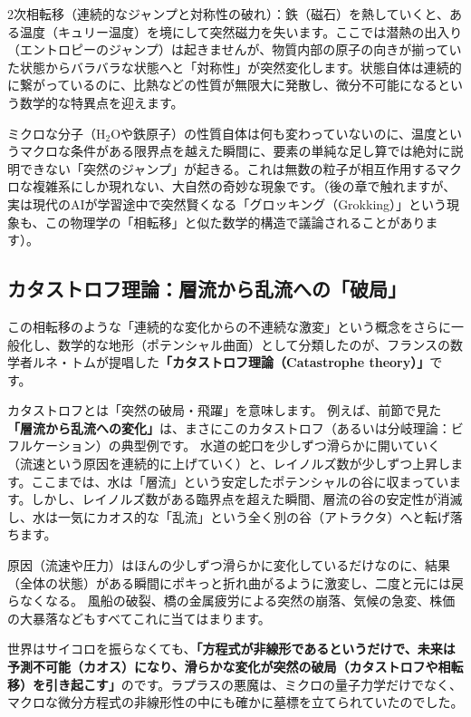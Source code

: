 2次相転移（連続的なジャンプと対称性の破れ）：鉄（磁石）を熱していくと、ある温度（キュリー温度）を境にして突然磁力を失います。ここでは潜熱の出入り（エントロピーのジャンプ）は起きませんが、物質内部の原子の向きが揃っていた状態からバラバラな状態へと「対称性」が突然変化します。状態自体は連続的に繋がっているのに、比熱などの性質が無限大に発散し、微分不可能になるという数学的な特異点を迎えます。

ミクロな分子（H\(_2\)Oや鉄原子）の性質自体は何も変わっていないのに、温度というマクロな条件がある限界点を越えた瞬間に、要素の単純な足し算では絶対に説明できない「突然のジャンプ」が起きる。これは無数の粒子が相互作用するマクロな複雑系にしか現れない、大自然の奇妙な現象です。（後の章で触れますが、実は現代のAIが学習途中で突然賢くなる「グロッキング（Grokking）」という現象も、この物理学の「相転移」と似た数学的構造で議論されることがあります）。

\subsection{カタストロフ理論：層流から乱流への「破局」}

この相転移のような「連続的な変化からの不連続な激変」という概念をさらに一般化し、数学的な地形（ポテンシャル曲面）として分類したのが、フランスの数学者ルネ・トムが提唱した\textbf{「カタストロフ理論（Catastrophe theory）」}です。

カタストロフとは「突然の破局・飛躍」を意味します。 例えば、前節で見た\textbf{「層流から乱流への変化」}は、まさにこのカタストロフ（あるいは分岐理論：ビフルケーション）の典型例です。 水道の蛇口を少しずつ滑らかに開いていく（流速という原因を連続的に上げていく）と、レイノルズ数が少しずつ上昇します。ここまでは、水は「層流」という安定したポテンシャルの谷に収まっています。しかし、レイノルズ数がある臨界点を超えた瞬間、層流の谷の安定性が消滅し、水は一気にカオス的な「乱流」という全く別の谷（アトラクタ）へと転げ落ちます。

原因（流速や圧力）はほんの少しずつ滑らかに変化しているだけなのに、結果（全体の状態）がある瞬間にポキっと折れ曲がるように激変し、二度と元には戻らなくなる。 風船の破裂、橋の金属疲労による突然の崩落、気候の急変、株価の大暴落などもすべてこれに当てはまります。

世界はサイコロを振らなくても、\textbf{「方程式が非線形であるというだけで、未来は予測不可能（カオス）になり、滑らかな変化が突然の破局（カタストロフや相転移）を引き起こす」}のです。ラプラスの悪魔は、ミクロの量子力学だけでなく、マクロな微分方程式の非線形性の中にも確かに墓標を立てられていたのでした。

